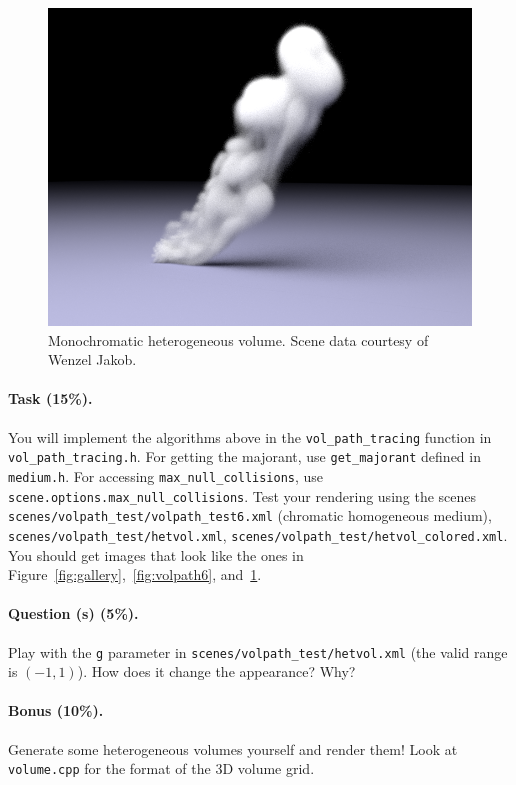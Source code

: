 \begin{figure}
\centering
\includegraphics[width=0.48\linewidth]{imgs/hetvol.png}
\caption{Monochromatic heterogeneous volume. Scene data courtesy of Wenzel Jakob.}
\label{fig:hetvol}
\end{figure}

\paragraph{Task (15\%).} You will implement the algorithms above in the \lstinline{vol_path_tracing} function in \lstinline{vol_path_tracing.h}. For getting the majorant, use \lstinline{get_majorant} defined in \lstinline{medium.h}. For accessing \lstinline{max_null_collisions}, use \lstinline{scene.options.max_null_collisions}. Test your rendering using the scenes \lstinline{scenes/volpath_test/volpath_test6.xml} (chromatic homogeneous medium), \lstinline{scenes/volpath_test/hetvol.xml},  \lstinline{scenes/volpath_test/hetvol_colored.xml}. You should get images that look like the ones in Figure~\ref{fig:gallery},~\ref{fig:volpath6}, and~\ref{fig:hetvol}.

\paragraph{Question (s) (5\%).} Play with the \lstinline{g} parameter in \lstinline{scenes/volpath_test/hetvol.xml} (the valid range is $(-1, 1)$). How does it change the appearance? Why? 

\paragraph{Bonus (10\%).} Generate some heterogeneous volumes yourself and render them! Look at \lstinline{volume.cpp} for the format of the 3D volume grid.




